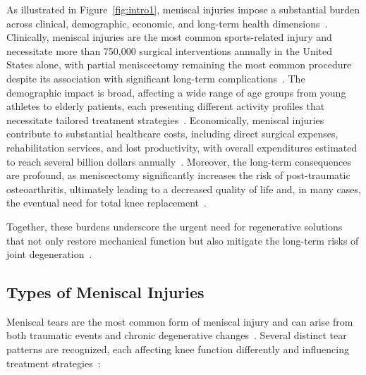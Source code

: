 As illustrated in Figure~\ref{fig:intro1}, meniscal injuries impose a substantial burden across clinical, demographic, economic, and long-term health dimensions~\cite{mordecai2014treatmentmeniscal, beeler2020meniscussizing, baek2015meniscustissue, abdelgaied2015comparisonbiomechanical}.
Clinically, meniscal injuries are the most common sports-related injury and necessitate more than 750,000 surgical interventions annually in the United States alone, with partial meniscectomy remaining the most common procedure despite its association with significant long-term complications~\cite{mordecai2014treatmentmeniscal, beeler2020meniscussizing, baek2015meniscustissue}.
The demographic impact is broad, affecting a wide range of age groups from young athletes to elderly patients, each presenting different activity profiles that necessitate tailored treatment strategies~\cite{mordecai2014treatmentmeniscal, baek2015meniscustissue, abdelgaied2015comparisonbiomechanical}.
Economically, meniscal injuries contribute to substantial healthcare costs, including direct surgical expenses, rehabilitation services, and lost productivity, with overall expenditures estimated to reach several billion dollars annually~\cite{beeler2020meniscussizing, mordecai2014treatmentmeniscal, baek2015meniscustissue}.
Moreover, the long-term consequences are profound, as meniscectomy significantly increases the risk of post-traumatic osteoarthritis, ultimately leading to a decreased quality of life and, in many cases, the eventual need for total knee replacement~\cite{mordecai2014treatmentmeniscal, abdelgaied2015comparisonbiomechanical, baek2015meniscustissue}.

Together, these burdens underscore the urgent need for regenerative solutions that not only restore mechanical function but also mitigate the long-term risks of joint degeneration~\cite{a.murphy20243dprintedvariable, bahcecioglu20193dprinted, baek2015meniscustissue}.

\subsection{Types of Meniscal Injuries}

Meniscal tears are the most common form of meniscal injury and can arise from both traumatic events and chronic degenerative changes~\cite{mordecai2014treatmentmeniscal, baek2015meniscustissue, abdelgaied2015comparisonbiomechanical}.
Several distinct tear patterns are recognized, each affecting knee function differently and influencing treatment strategies~\cite{makris2011kneemeniscus, szojka2017biomimetic3d, athanasiou2009engineeringknee}:

